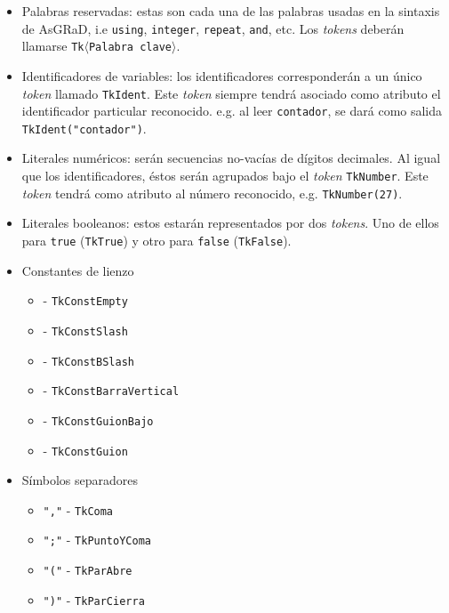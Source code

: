 \documentclass[letterpaper,10pt]{article}
\newcommand{\asgrad}{AsGRaD\xspace}
\newcommand{\general}[1]{$\langle$\texttt{#1}$\rangle$}
\newcommand{\ttt}[1]{\texttt{#1}}
\begin{document}
\begin{itemize}
    \item Palabras reservadas: estas son cada una de las palabras usadas en la sintaxis de \asgrad, i.e \ttt{using}, \ttt{integer}, \ttt{repeat}, \ttt{and}, etc. Los \textit{tokens} deberán llamarse \ttt{Tk}\general{Palabra clave}.
    \item Identificadores de variables: los identificadores corresponderán a un único \textit{token} llamado \texttt{TkIdent}. Este \textit{token} siempre tendrá asociado como atributo el identificador particular reconocido. e.g. al leer \texttt{contador}, se dará como salida \texttt{TkIdent("contador")}.
    \item Literales numéricos: serán secuencias no-vacías de dígitos decimales. Al igual que los identificadores, éstos serán agrupados bajo el \textit{token} \texttt{TkNumber}. Este \textit{token} tendrá como atributo al número reconocido, e.g. \texttt{TkNumber(27)}.
    \item Literales booleanos: estos estarán representados por dos \textit{tokens}. Uno de ellos para \texttt{true} (\texttt{TkTrue}) y otro para \texttt{false} (\texttt{TkFalse}).
    \item Constantes de lienzo
        \begin{itemize}
            \item[]   - \texttt{TkConstEmpty}
            \item[] \makebox[4em]{\texttt{</>} \hfill} - \texttt{TkConstSlash}
            \item[] \makebox[4em]{\texttt{<\textbackslash>}\hfill}  - \texttt{TkConstBSlash}
            \item[] \makebox[4em]{\texttt{<|>} \hfill} - \texttt{TkConstBarraVertical}
            \item[] \makebox[4em]{\texttt{<\_>}\hfill}  - \texttt{TkConstGuionBajo}
            \item[] \makebox[4em]{\texttt{<->} \hfill} - \texttt{TkConstGuion}
        \end{itemize}
    \item Símbolos separadores
        \begin{itemize}
            \item[] \texttt{","} - \texttt{TkComa}
            \item[] \texttt{";"} - \texttt{TkPuntoYComa}
            \item[] \texttt{"("} - \texttt{TkParAbre}
            \item[] \texttt{")"} - \texttt{TkParCierra}

\end{itemize}
\end{itemize}
\end{document}
